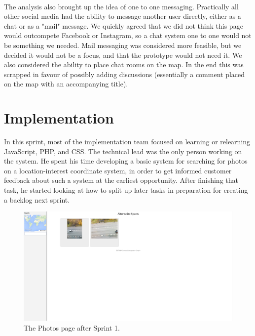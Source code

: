 \paragraph{} The analysis also brought up the idea of one to one messaging. Practically all other social media had the ability to message another user directly, either as a chat or as a "mail" message. We quickly agreed that we did not think this page would outcompete Facebook or Instagram, so a chat system one to one would not be something we needed. Mail messaging was considered more feasible, but we decided it would not be a focus, and that the prototype would not need it. We also considered the ability to place chat rooms on the map. In the end this was scrapped in favour of possibly adding discussions (essentially a comment placed on the map with an accompanying title).

\section{Implementation}
\label{sec:S1Implementation}
In this sprint, most of the implementation team focused on learning or relearning JavaScript, PHP, and CSS. The technical lead was the only person working on the system. He spent his time developing a basic system for searching for photos on a location-interest coordinate system, in order to get informed customer feedback about such a system at the earliest opportunity. After finishing that task, he started looking at how to split up later tasks in preparation for creating a backlog next sprint.

\begin{figure}[ht!]
\centering
\includegraphics[width=\linewidth]{./img/webpage/22Sep/Photos22Sep}
\caption{The Photos page after Sprint 1. \label{fig:Photos22Sep}}
\end{figure}

